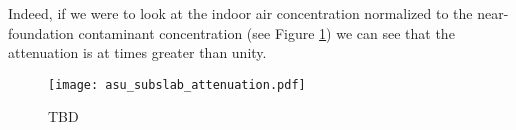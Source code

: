 Indeed, if we were to look at the indoor air concentration normalized to the near-foundation contaminant concentration (see Figure \ref{fig:asu_subslab_attenuation}) we can see that the attenuation is at times greater than unity.

\begin{figure}[htb!]
  \texttt{[image: asu\_subslab\_attenuation.pdf]}
  \caption{TBD}
  \label{fig:asu_subslab_attenuation}
\end{figure}
